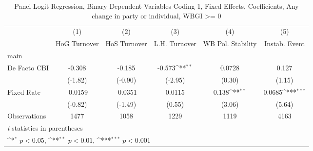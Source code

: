 \begin{table}[htbp]\centering
\def\sym#1{\ifmmode^{#1}\else\(^{#1}\)\fi}
\caption{Panel Logit Regression, Binary Dependent Variables Coding 1, Fixed Effects, Coefficients, Any change in party or individual, WBGI >= 0 \label{logitFEMultIndDF}}
\begin{tabular}{l*{5}{c}}
\toprule
                                        &\multicolumn{1}{c}{(1)}&\multicolumn{1}{c}{(2)}&\multicolumn{1}{c}{(3)}&\multicolumn{1}{c}{(4)}&\multicolumn{1}{c}{(5)}\\
                                        &\multicolumn{1}{c}{HoG Turnover}&\multicolumn{1}{c}{HoS Turnover}&\multicolumn{1}{c}{L.H. Turnover}&\multicolumn{1}{c}{WB Pol. Stability}&\multicolumn{1}{c}{Instab. Event}\\
\midrule
main                                    &                  &                  &                  &                  &                  \\
De Facto CBI                            &   -0.308         &   -0.185         &   -0.573\sym{**} &   0.0728         &    0.127         \\
                                        &  (-1.82)         &  (-0.90)         &  (-2.95)         &   (0.30)         &   (1.15)         \\
\addlinespace
Fixed Rate                              &  -0.0159         &  -0.0351         &   0.0115         &    0.138\sym{**} &   0.0685\sym{***}\\
                                        &  (-0.82)         &  (-1.49)         &   (0.55)         &   (3.06)         &   (5.64)         \\
\midrule
Observations                            &     1477         &     1058         &     1229         &     1119         &     4163         \\
\bottomrule
\multicolumn{6}{l}{\footnotesize \textit{t} statistics in parentheses}\\
\multicolumn{6}{l}{\footnotesize \sym{*} \(p<0.05\), \sym{**} \(p<0.01\), \sym{***} \(p<0.001\)}\\
\end{tabular}
\end{table}
